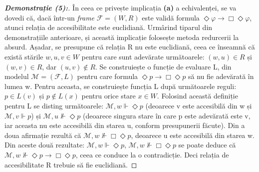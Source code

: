 \documentclass[12pt, openany]{book}
\begin{document}
            \begin{proof}[\textbf{Demonstrație (5):}]
                În ceea ce privește implicația \textbf{(a)} a echivalenței, se va dovedi că, dacă într-un \textit{frame} 
                $\mathcal{F}=(W,R)$ este validă formula $\Diamond \varphi \rightarrow \Box \Diamond \varphi$, atunci relația
                de accesibilitate este euclidiană. Urmârind tiparul din demonstrațiile anterioare, și această implicație 
                folosește metoda redurcerii la absurd. Așadar, se presupune că relația R nu este euclidiană, ceea ce 
                înseamnă că există stările $w,u,v \in W$ pentru care sunt adevărate următoarele: $(w,u) \in R$ și $(w,v) \in
                R$, dar $(u,v) \notin R$. Se construiește o funcție de evaluare L, din modelul $\mathcal{M}=(\mathcal{F},L)$
                pentru care formula $\Diamond p \rightarrow \Box \Diamond p$ să nu fie adevărată în lumea w. Pentru aceasta, 
                se construiește funcția L după următoarele reguli: $p \in L(v)$ și $p \notin L(x)$ pentru orice stare $x \in
                W$. Folosind această definiție pentru L se disting următoarele: $\mathcal{M},w \Vdash \Diamond p$ (deoarece 
                v este accesibilă din w și $\mathcal{M},v \Vdash p$) și $\mathcal{M},u \nVdash \Diamond p$ (deoarece singura
                stare în care p este adevărată este v, iar aceasta nu este accesibilă din starea u, conform presupunerii 
                făcute). Din a doua afirmație rezultă că $\mathcal{M},w \nVdash \Box \Diamond p$, deoarece u este accesibilă
                din starea w. Din aceste două rezultate: $\mathcal{M},w \Vdash \Diamond p$, $\mathcal{M},w \nVdash \Box 
                \Diamond p$ se poate deduce că $\mathcal{M},w \nVdash \Diamond p \rightarrow \Box \Diamond p$, ceea ce 
                conduce la o contradicție. Deci relația de accesibilitate R trebuie să fie euclidiană.


\end{proof}
\end{document}
